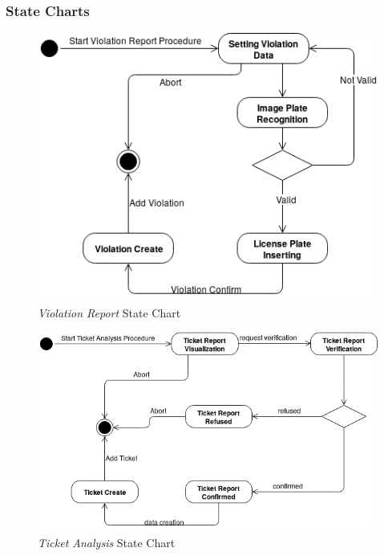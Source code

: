 \documentclass {article}
\begin{document}
	\subsubsection{State Charts}	
	\begin{figure}[H]
				\centering
				\includegraphics[scale=0.7]{Images/Diagrams/ViolationStateChart.png}
				\caption{{\it Violation Report} State Chart}
	\end{figure}
	\pagebreak
	\begin{figure}[H]
				\centering
				\includegraphics[scale=0.6]{Images/Diagrams/TicketStateChart.png}
				\caption{{\it Ticket Analysis} State Chart}
	\end{figure}
		
\end{document}
